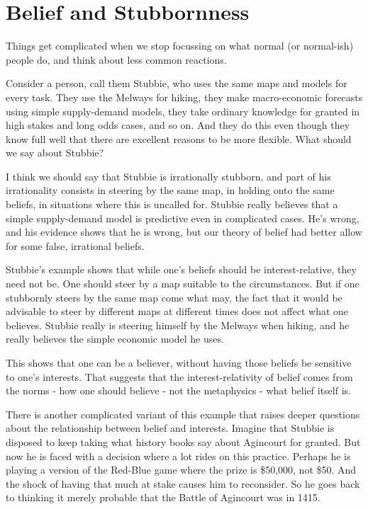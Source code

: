 \documentclass[
  11pt,
]{book}
\begin{document}
\hypertarget{stubbie}{%
\section{Belief and Stubbornness}\label{stubbie}}

Things get complicated when we stop focussing on what normal (or normal-ish) people do, and think about less common reactions.

Consider a person, call them Stubbie, who uses the same maps and models for every task. They use the Melways for hiking, they make macro-economic forecasts using simple supply-demand models, they take ordinary knowledge for granted in high stakes and long odds cases, and so on. And they do this even though they know full well that there are excellent reasons to be more flexible. What should we say about Stubbie?

I think we should say that Stubbie is irrationally stubborn, and part of his irrationality consists in steering by the same map, in holding onto the same beliefs, in situations where this is uncalled for. Stubbie really believes that a simple supply-demand model is predictive even in complicated cases. He's wrong, and his evidence shows that he is wrong, but our theory of belief had better allow for some false, irrational beliefs.

Stubbie's example shows that while one's beliefs should be interest-relative, they need not be. One should steer by a map suitable to the circumstances. But if one stubbornly steers by the same map come what may, the fact that it would be advisable to steer by different maps at different times does not affect what one believes. Stubbie really is steering himself by the Melways when hiking, and he really believes the simple economic model he uses.

This shows that one can be a believer, without having those beliefs be sensitive to one's interests. That suggests that the interest-relativity of belief comes from the norms - how one should believe - not the metaphysics - what belief itself is.

There is another complicated variant of this example that raises deeper questions about the relationship between belief and interests. Imagine that Stubbie is disposed to keep taking what history books say about Agincourt for granted. But now he is faced with a decision where a lot rides on this practice. Perhaps he is playing a version of the Red-Blue game where the prize is \$50,000, not \$50. And the shock of having that much at stake causes him to reconsider. So he goes back to thinking it merely probable that the Battle of Agincourt was in 1415.
\end{document}
